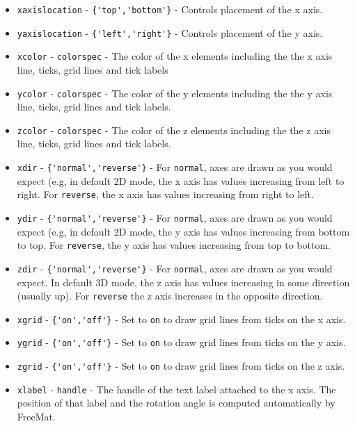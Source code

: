 \begin{itemize}
\item  \verb|xaxislocation| - \verb|{'top','bottom'}| - Controls placement of the x axis.

\item  \verb|yaxislocation| - \verb|{'left','right'}| - Controls placement of the y axis.

\item  \verb|xcolor| - \verb|colorspec| - The color of the x elements including the the x axis
 line, ticks, grid lines and tick labels

\item  \verb|ycolor| - \verb|colorspec| - The color of the y elements including the the y axis
 line, ticks, grid lines and tick labels.

\item  \verb|zcolor| - \verb|colorspec| - The color of the z elements including the the z axis
 line, ticks, grid lines and tick labels.

\item  \verb|xdir| - \verb|{'normal','reverse'}| - For \verb|normal|, axes are drawn as you
 would expect (e.g, in default 2D mode, the x axis has values increasing from left
 to right.  For \verb|reverse|, the x axis has values increasing from right to left.

\item  \verb|ydir| - \verb|{'normal','reverse'}| - For \verb|normal|, axes are drawn as you
 would expect (e.g, in default 2D mode, the y axis has values increasing from bottom
 to top.  For \verb|reverse|, the y axis has values increasing from top to bottom.

\item  \verb|zdir| - \verb|{'normal','reverse'}| - For \verb|normal|, axes are drawn as you
 would expect. In default 3D mode, the z axis has values increasing in some direction
 (usually up).  For \verb|reverse| the z axis increases in the opposite direction.

\item  \verb|xgrid| - \verb|{'on','off'}| - Set to \verb|on| to draw grid lines from ticks on
 the x axis.

\item  \verb|ygrid| - \verb|{'on','off'}| - Set to \verb|on| to draw grid lines from ticks on
 the y axis.

\item  \verb|zgrid| - \verb|{'on','off'}| - Set to \verb|on| to draw grid lines from ticks on
 the z axis.

\item  \verb|xlabel| - \verb|handle| - The handle of the text label attached to the x axis.
 The position of that label and the rotation angle is computed automatically by
 FreeMat.


\end{itemize}
